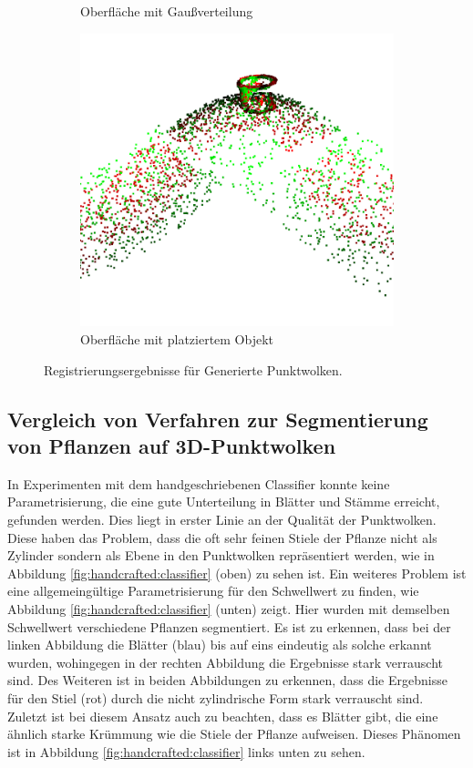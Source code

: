 \documentclass[12pt,titlepage, twoside]{article}
\begin{document}
\begin{figure}[htb]
\begin{subfigure}{0.3\textwidth}
  \caption{Oberfläche mit Gaußverteilung}
  \label{fig:registration:gauss}
\end{subfigure}\hfil
\begin{subfigure}{0.3\textwidth}
  \includegraphics[width=\linewidth]{./Images/Registration_Pot.png}
  \caption{Oberfläche mit platziertem Objekt}
  \label{fig:registration:pot}
\end{subfigure}
\caption{Registrierungsergebnisse für Generierte Punktwolken.}
\label{fig:registration:generated}
\end{figure}

\subsection{Vergleich von Verfahren zur Segmentierung von Pflanzen auf 3D-Punktwolken}

In Experimenten mit dem handgeschriebenen Classifier konnte keine Parametrisierung, die eine gute Unterteilung in Blätter und Stämme erreicht, gefunden werden. 
Dies liegt in erster Linie an der Qualität der Punktwolken.
Diese haben das Problem, dass die oft sehr feinen Stiele der Pflanze nicht als Zylinder sondern als Ebene in den Punktwolken repräsentiert werden, wie in Abbildung \ref{fig:handcrafted:classifier} (oben) zu sehen ist.
Ein weiteres Problem ist eine allgemeingültige Parametrisierung für den Schwellwert zu finden, wie Abbildung \ref{fig:handcrafted:classifier} (unten) zeigt. Hier wurden mit demselben Schwellwert verschiedene Pflanzen segmentiert.
Es ist zu erkennen, dass bei der linken Abbildung die Blätter (blau) bis auf eins eindeutig als solche erkannt wurden, wohingegen in der rechten Abbildung die Ergebnisse stark verrauscht sind. 
Des Weiteren ist in beiden Abbildungen zu erkennen, dass die Ergebnisse für den Stiel (rot) durch die nicht zylindrische Form stark verrauscht sind.
Zuletzt ist bei diesem Ansatz auch zu beachten, dass es Blätter gibt, die eine ähnlich starke Krümmung wie die Stiele der Pflanze aufweisen. Dieses Phänomen ist in Abbildung \ref{fig:handcrafted:classifier} links unten zu sehen.
\end{document}
